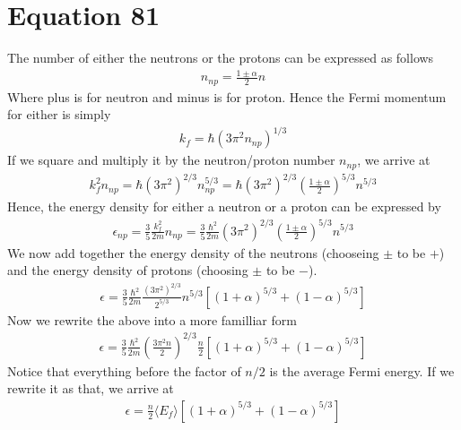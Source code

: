 \documentclass{article}
\newcommand{\la}{\langle}
\newcommand{\ra}{\rangle}
\begin{document}
 \section*{Equation 81}
 The number of either the neutrons or the protons can be expressed as follows 
 \begin{align}
    n_{np}=\frac{1\pm\alpha}{2}n
 \end{align}
 Where plus is for neutron and minus is for proton. 
 Hence the Fermi momentum for either is simply 
 \begin{align}
    k_{f}=\hbar(3\pi^2 n_{np})^{1/3}
 \end{align}
 If we square and multiply it by the neutron/proton number $n_{np}$, we arrive at 
 \begin{align}
    k_f^2n_{np}=\hbar(3\pi^2)^{2/3}n_{np}^{5/3}=\hbar(3\pi^2)^{2/3}(\frac{1\pm\alpha}{2})^{5/3}n^{5/3}
 \end{align}
Hence, the energy density for either a neutron or a proton can be expressed by 
\begin{align}
    \epsilon_{np}=\frac{3}{5}\frac{k_f^2}{2m}n_{np}=\frac{3}{5}\frac{\hbar^2}{2m}(3\pi^2)^{2/3}(\frac{1\pm\alpha}{2})^{5/3}n^{5/3}
\end{align}
We now add together the energy density of the neutrons (chooseing $\pm$ to be $+$) and the energy density of protons (choosing $\pm$ to be $-$).
\begin{align}
    \epsilon=\frac{3}{5}\frac{\hbar^2}{2m}\frac{(3\pi^2)^{2/3}}{2^{5/3}}n^{5/3}[(1+\alpha)^{5/3}+(1-\alpha)^{5/3}] 
\end{align}
Now we rewrite the above into a more familliar form 
\begin{align}
    \epsilon=\frac{3}{5}\frac{\hbar^2}{2m}(\frac{3\pi^2 n}{2})^{2/3}\frac{n}{2}[(1+\alpha)^{5/3}+(1-\alpha)^{5/3}] 
\end{align}
Notice that everything before the factor of $n/2$ is the average Fermi energy. If we rewrite it as that, we arrive at 
\begin{align}
    \boxed{\epsilon=\frac{n}{2}\la E_f\ra[(1+\alpha)^{5/3}+(1-\alpha)^{5/3}] }
\end{align}
\end{document}
